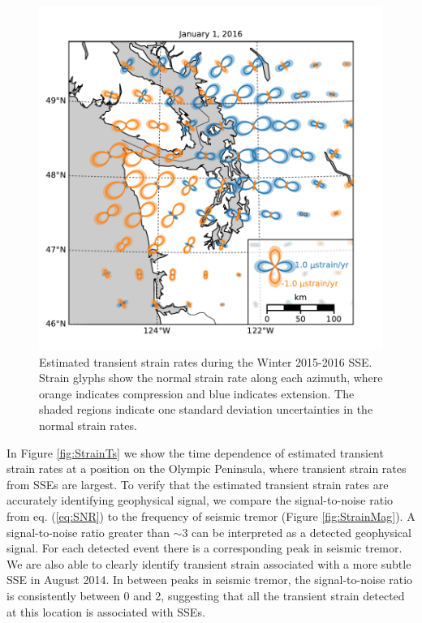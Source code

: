 \documentclass[extra,mreferee]{gji}
\begin{document}
\begin{figure}
\includegraphics{figures/strain_map/strain-map.pdf}
\caption{Estimated transient strain rates during the Winter 2015-2016 SSE. Strain glyphs show the normal strain rate along each azimuth, where orange indicates compression and blue indicates extension. The shaded regions indicate one standard deviation uncertainties in the normal strain rates.}   
\label{fig:StrainMap}
\end{figure}

In Figure \ref{fig:StrainTs} we show the time dependence of estimated transient strain rates at a position on the Olympic Peninsula, where transient strain rates from SSEs are largest. To verify that the estimated transient strain rates are accurately identifying geophysical signal, we compare the signal-to-noise ratio from eq. (\ref{eq:SNR}) to the frequency of seismic tremor (Figure \ref{fig:StrainMag}). A signal-to-noise ratio greater than ${\sim}3$ can be interpreted as a detected geophysical signal. For each detected event there is a corresponding peak in seismic tremor. We are also able to clearly identify transient strain associated with a more subtle SSE in August 2014. In between peaks in seismic tremor, the signal-to-noise ratio is consistently between 0 and 2, suggesting that all the transient strain detected at this location is associated with SSEs.
\end{document}

